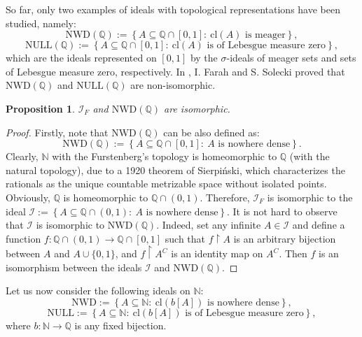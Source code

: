 \documentclass{amsart}
\newtheorem{prop}[thm]{Proposition}
\theoremstyle{definition}
\newtheorem{problem}[thm]{Problem}
\theoremstyle{definition}
\newcommand{\N}{{\mathbb N}}
\newcommand{\Q}{{\mathbb Q}}
\newcommand{\I}{\mathcal I}
\newcommand{\NULL}{\mathrm{NULL}}
\newcommand{\NWD}{\mathrm{NWD}}
\newcommand{\cl}{\mathrm{cl}}
\begin{document}
So far, only two examples of ideals with topological representations have been studied, namely:
$$\NWD(\Q):=\left\{A\subseteq\mathbb{Q}\cap [0,1] :\ \cl(A) \textrm{ is meager}\right\},$$
$$\NULL(\Q):=\left\{A\subseteq\mathbb{Q}\cap [0,1] :\ \cl(A) \textrm{ is of Lebesgue measure zero}\right\},$$
which are the ideals represented on $[0,1]$ by the $\sigma$-ideals of meager sets and sets of Lebesgue measure zero, respectively. In \cite{FS}, I. Farah and S. Solecki proved that $\NWD(\Q)$ and $\NULL(\Q)$ are non-isomorphic.



\begin{prop}
$\I_F$ and $\NWD(\Q)$ are isomorphic.
\end{prop}
\begin{proof}
Firstly, note that $\NWD(\Q)$ can be also defined as:
$$\NWD(\Q) := \left\{A\subseteq\mathbb{Q}\cap [0,1] :\ A \textrm{ is nowhere dense}\right\}.$$
Clearly, $\N$ with the Furstenberg's topology is homeomorphic to $\Q$ (with the natural topology), due to a 1920 theorem of Sierpi\'nski, which characterizes the rationals as the unique countable metrizable space without isolated points. Obviously, $\Q$ is homeomorphic to $\Q\cap (0,1)$. Therefore, $\I_F$ is isomorphic to the ideal $\I := \left\{A\subseteq\Q\cap (0,1) :\ A \textrm{ is nowhere dense}\right\}$. It is not hard to observe that $\I$ is isomorphic to $\NWD(\Q)$. Indeed, set any infinite $A\in\I$ and define a function $f \colon \Q\cap (0,1) \to \Q\cap [0,1]$ such that $f\upharpoonright A$ is an arbitrary bijection between $A$ and $A\cup\{0,1\}$, and $f\upharpoonright A^C$ is an identity map on $A^C$. Then $f$ is an isomorphism between the ideals $\I$ and $\NWD(\Q)$.
\end{proof}

Let us now consider the following ideals on $\N$:
$$\NWD :=\left\{A\subseteq\N :\ \cl(b[A]) \textrm{ is nowhere dense}\right\},$$
$$\NULL :=\left\{A\subseteq\N :\ \cl(b[A]) \textrm{ is of Lebesgue measure zero}\right\},$$
where $b\colon\N\to\Q$ is any fixed bijection.

\end{document}
